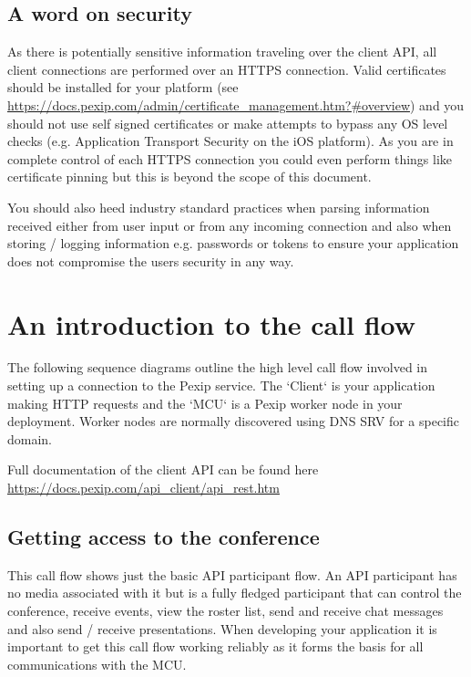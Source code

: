 \documentclass[a4paper,11pt]{article}
\begin{document}
\subsection{A word on security}
\label{sec:orgheadline3}

As there is potentially sensitive information traveling over the
client API, all client connections are performed over an HTTPS
connection.  Valid certificates should be installed for your platform
(see
\url{https://docs.pexip.com/admin/certificate_management.htm?#overview}) and
you should not use self signed certificates or make attempts to bypass
any OS level checks (e.g. Application Transport Security on the iOS
platform).  As you are in complete control of each HTTPS connection
you could even perform things like certificate pinning but this is
beyond the scope of this document.

You should also heed industry standard practices when parsing
information received either from user input or from any incoming
connection and also when storing / logging information e.g. passwords
or tokens to ensure your application does not compromise the users
security in any way.

\section{An introduction to the call flow}
\label{sec:orgheadline32}

The following sequence diagrams outline the high level call flow
involved in setting up a connection to the Pexip service.  The
`Client` is your application making HTTP requests and the `MCU` is a
Pexip worker node in your deployment.  Worker nodes are normally
discovered using DNS SRV for a specific domain.

Full documentation of the client API can be found here
\url{https://docs.pexip.com/api_client/api_rest.htm}

\subsection{Getting access to the conference}
\label{sec:orgheadline10}

This call flow shows just the basic API participant flow.  An API
participant has no media associated with it but is a fully fledged
participant that can control the conference, receive events, view the
roster list, send and receive chat messages and also send / receive
presentations.  When developing your application it is important to
get this call flow working reliably as it forms the basis for all
communications with the MCU.
\end{document}
